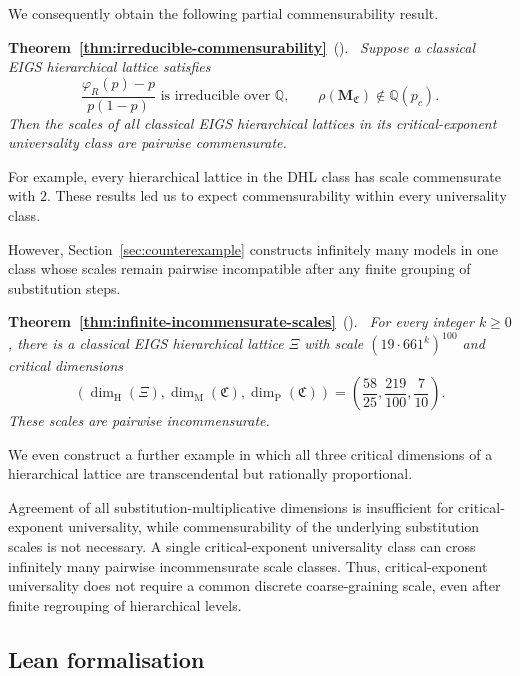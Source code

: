 \documentclass[scheme=plain,11pt]{ctexart}
\theoremstyle{definition}
\theoremstyle{remark}
\newenvironment{restated}[3][]{\par\medskip\noindent\textbf{#2~\ref{#3}}\if\relax\detokenize{#1}\relax\else\ \textup{(#1)}\fi.\ \itshape}{\par\medskip}
\begin{document}
We consequently obtain the following partial commensurability result.
\begin{restated}{Theorem}{thm:irreducible-commensurability}
Suppose a classical EIGS hierarchical lattice satisfies
\[
 \frac{\varphi_R(p)-p}{p(1-p)}\text{ is irreducible over }\mathbb Q,
 \qquad \rho(\mathbf M_{\mathfrak C})\notin\mathbb Q(p_c).
\]
Then the scales of all classical EIGS hierarchical lattices in its critical-exponent universality class are pairwise commensurate.
\end{restated}
For example, every hierarchical lattice in the DHL class has scale commensurate with $2$.
These results led us to expect commensurability within every universality class.

However, Section~\ref{sec:counterexample} constructs infinitely many models in one class whose scales remain pairwise incompatible after any finite grouping of substitution steps.
\begin{restated}{Theorem}{thm:infinite-incommensurate-scales}
For every integer $k\ge0$, there is a classical EIGS hierarchical lattice $\Xi$ with scale $(19\cdot661^k)^{100}$ and critical dimensions
\[
 (\dim_{\mathrm H}(\Xi),\dim_{\mathrm M}(\mathfrak C),\dim_{\mathrm P}(\mathfrak C))
 =\left(\frac{58}{25},\frac{219}{100},\frac7{10}\right).
\]
These scales are pairwise incommensurate.
\end{restated}

We even construct a further example in which all three critical dimensions of a hierarchical lattice are transcendental but rationally proportional.


Agreement of all substitution-multiplicative dimensions is insufficient for critical-exponent universality, while commensurability of the underlying substitution scales is not necessary. 
A single critical-exponent universality class can cross infinitely many pairwise incommensurate scale classes. 
Thus, critical-exponent universality does not require a common discrete coarse-graining scale, even after finite regrouping of hierarchical levels.




\subsection{Lean formalisation}
\end{document}
